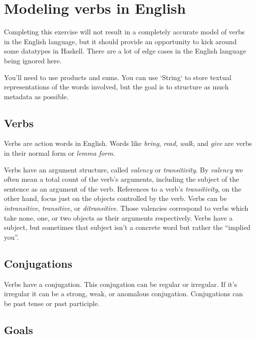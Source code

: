 \documentclass{article}
\begin{document}
\section{Modeling verbs in English}

Completing this exercise will not result in a completely accurate model of verbs in the English language, but it should provide an opportunity to kick around some datatypes in Haskell. There are a lot of edge cases in the English language being ignored here.

You'll need to use products and sums. You can use `String` to store textual representations of the words involved, but the goal is to structure as much metadata as possible.

\subsection{Verbs}

Verbs are action words in English. Words like \emph{bring}, \emph{read}, \emph{walk}, and \emph{give} are verbs in their normal form or \emph{lemma form}.

Verbs have an argument structure, called \emph{valency} or \emph{transitivity}. By \emph{valency} we often mean a total count of the verb's arguments, including the subject of the sentence as an argument of the verb. References to a verb's \emph{transitivity}, on the other hand, focus just on the objects controlled by the verb. Verbs can be \emph{intransitive}, \emph{transitive}, or \emph{ditransitive}. Those valencies correspond to verbs which take none, one, or two objects as their arguments respectively. Verbs have a subject, but sometimes that subject isn't a concrete word but rather the ``implied you''. 

\subsection{Conjugations}

Verbs have a conjugation. This conjugation can be regular or irregular. If it's irregular it can be a strong, weak, or anomalous conjugation. Conjugations can be past tense or past participle. 

\subsection{Goals}
\end{document}
